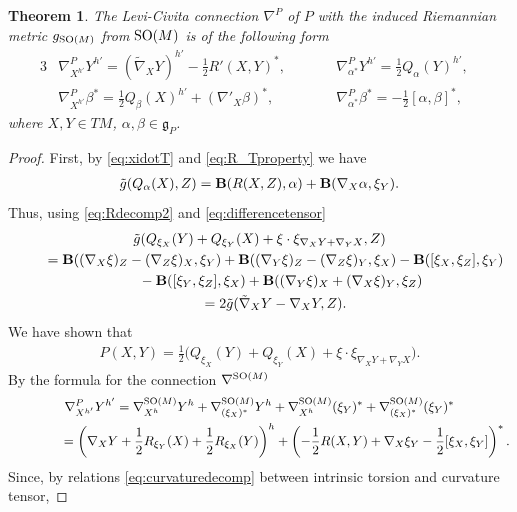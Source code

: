 \documentclass[pdftex]{sigma}
\numberwithin{equation}{section}
\newtheorem{Theorem}{Theorem}[section]
\begin{document}
\begin{Theorem}\label{thm:nablaP}
The Levi-Civita connection $\nabla^P$ of $P$ with the induced Riemannian metric $g_{{\rm SO}(M)}$ from ${\rm SO}(M)$ is of the following form
\begin{alignat*}{3}
& \nabla^P_{X^{h'}}Y^{h'} =(\tilde\nabla_XY)^{h'}-\frac{1}{2}R'(X,Y)^{\ast},\qquad && \nabla^P_{\alpha^{\ast}}Y^{h'} =\frac{1}{2}Q_{\alpha}(Y)^{h'},&\\
& \nabla^P_{X^{h'}}\beta^{\ast} =\frac{1}{2}Q_{\beta}(X)^{h'}+(\nabla'_X\beta)^{\ast},\qquad && \nabla^P_{\alpha^{\ast}}\beta^{\ast} =-\frac{1}{2}[\alpha,\beta]^{\ast},&
\end{alignat*}
where $X,Y\in TM$, $\alpha,\beta\in\mathfrak{g}_P$.
\end{Theorem}
\begin{proof}
First, by \eqref{eq:xidotT} and \eqref{eq:R_Tproperty} we have
\begin{gather*}
\tilde{g}(Q_{\alpha}(X),Z)={\bf B}(R(X,Z),\alpha)+{\bf B}(\nabla_X\alpha,\xi_Y).
\end{gather*}
Thus, using \eqref{eq:Rdecomp2} and \eqref{eq:differencetensor}
\begin{gather*}
\tilde{g}(Q_{\xi_X}(Y)+Q_{\xi_Y}(X)+\xi\cdot\xi_{\nabla_XY+\nabla_YX},Z)\\
\qquad {}= {\bf B}((\nabla_X\xi)_Z-(\nabla_Z\xi)_X,\xi_Y)+{\bf B}((\nabla_Y\xi)_Z-(\nabla_Z\xi)_Y,\xi_X)-{\bf B}([\xi_X,\xi_Z],\xi_Y)\\
\qquad \quad{}-{\bf B}([\xi_Y,\xi_Z],\xi_X)+{\bf B}((\nabla_Y\xi)_X+(\nabla_X\xi)_Y,\xi_Z)\\
\qquad {} =2\tilde{g}(\tilde{\nabla}_XY-\nabla_XY,Z).
\end{gather*}
We have shown that
\begin{gather}\label{eq:nablaPproof}
P(X,Y)=\frac{1}{2}\big(Q_{\xi_X}(Y)+Q_{\xi_Y}(X)+\xi\cdot\xi_{\nabla_XY+\nabla_YX}\big).
\end{gather}
By the formula for the connection $\nabla^{{\rm SO}(M)}$
\begin{gather*}
\nabla^P_{X^{h'}}Y^{h'} = \nabla^{{\rm SO}(M)}_{X^h}Y^h+\nabla^{{\rm SO}(M)}_{(\xi_X)^{\ast}}Y^h
+\nabla^{{\rm SO}(M)}_{X^h}(\xi_Y)^{\ast}+\nabla^{{\rm SO}(M)}_{(\xi_X)^{\ast}}(\xi_Y)^{\ast}\\
\hphantom{\nabla^P_{X^{h'}}Y^{h'}}{}
=\left(\nabla_XY+\frac{1}{2}R_{\xi_Y}(X)+\frac{1}{2}R_{\xi_X}(Y)\right)^h+\left(-\frac{1}{2}R(X,Y)+\nabla_X\xi_Y-\frac{1}{2}[\xi_X,\xi_Y]\right)^{\ast}.
\end{gather*}
Since, by relations \eqref{eq:curvaturedecomp} between intrinsic torsion and curvature tensor,

\end{proof}
\end{document}
